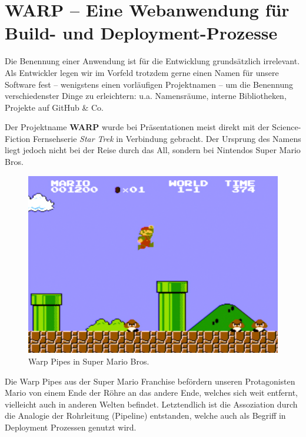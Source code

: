 
\chapter{WARP – Eine Webanwendung für Build- und Deployment-Prozesse}

Die Benennung einer Anwendung ist für die Entwicklung grundsätzlich irrelevant. Als Entwickler legen wir im Vorfeld trotzdem gerne einen Namen für unsere Software fest – wenigstens einen vorläufigen Projektnamen – um die Benennung verschiedenster Dinge zu erleichtern: u.a. Namensräume, interne Bibliotheken, Projekte auf GitHub \& Co.

Der Projektname \textbf{WARP} wurde bei Präsentationen meist direkt mit der Science-Fiction Fernsehserie \emph{Star Trek} in Verbindung gebracht. Der Ursprung des Namens liegt jedoch nicht bei der Reise durch das All, sondern bei Nintendos Super Mario Bros.

\begin{figure}[h]
  \caption{Warp Pipes in Super Mario Bros.}
  \label{fig:super-mario-warp-pipes}
  \centering
    \includegraphics[width=.5\textwidth]{assets/mario-pipes}
\end{figure}

Die Warp Pipes aus der Super Mario Franchise befördern unseren Pro\-ta\-go\-nisten Mario von einem Ende der Röhre an das andere Ende, welches sich weit entfernt, vielleicht auch in anderen Welten befindet. Letztendlich ist die Assoziation durch die Analogie der Rohrleitung (Pipeline) entstanden, welche auch als Begriff in Deployment Prozessen genutzt wird.

